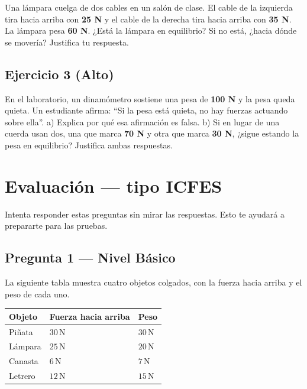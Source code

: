 \documentclass[
  spanish,
  letterpaper,
  12pt,
  oneside,
  open=any,
  DIV=15]{scrbook}
\newcounter{none} %
\newcommand{\setcolorsection}[2]{%
  \definecolor{currentsectionbg}{HTML}{#1}%
  \definecolor{currentsectionborder}{HTML}{#2}%
}
\begin{document}
Una lámpara cuelga de dos cables en un salón de clase. El cable de la
izquierda tira hacia arriba con \textcolor[HTML]{7C3AED}{\textbf{25 N}}
y el cable de la derecha tira hacia arriba con
\textcolor[HTML]{7C3AED}{\textbf{35 N}}. La lámpara pesa
\textcolor[HTML]{2563EB}{\textbf{60 N}}. ¿Está la lámpara en equilibrio?
Si no está, ¿hacia dónde se movería? Justifica tu respuesta.

\subsection{Ejercicio 3 (Alto)}\label{ejercicio-3-alto-2}

En el laboratorio, un dinamómetro sostiene una pesa de
\textcolor[HTML]{2563EB}{\textbf{100 N}} y la pesa queda quieta. Un
estudiante afirma: ``Si la pesa está quieta, no hay fuerzas actuando
sobre ella''. a) Explica por qué esa afirmación es falsa. b) Si en lugar
de una cuerda usan dos, una que marca
\textcolor[HTML]{7C3AED}{\textbf{70 N}} y otra que marca
\textcolor[HTML]{7C3AED}{\textbf{30 N}}, ¿sigue estando la pesa en
equilibrio? Justifica ambas respuestas.

\setcolorsection{f0c4b8}{dcb0a4}

\section{Evaluación --- tipo ICFES}\label{evaluaciuxf3n-tipo-icfes-3}

Intenta responder estas preguntas sin mirar las respuestas. Esto te
ayudará a prepararte para las pruebas.

\subsection{Pregunta 1 --- Nivel
Básico}\label{pregunta-1-nivel-buxe1sico-3}

La siguiente tabla muestra cuatro objetos colgados, con la fuerza hacia
arriba y el peso de cada uno.

{\def\LTcaptype{none} %
\begin{longtable}[]{@{}lll@{}}
\toprule\noalign{}
Objeto & Fuerza hacia arriba & Peso \\
\midrule\noalign{}
\endhead
\bottomrule\noalign{}
\endlastfoot
Piñata & \(30\,\text{N}\) & \(30\,\text{N}\) \\
Lámpara & \(25\,\text{N}\) & \(20\,\text{N}\) \\
Canasta & \(6\,\text{N}\) & \(7\,\text{N}\) \\
Letrero & \(12\,\text{N}\) & \(15\,\text{N}\) \\
\end{longtable}
}
\end{document}
